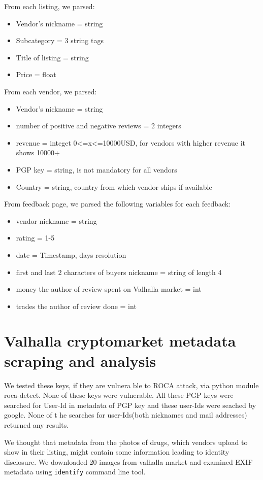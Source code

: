 \documentclass[
  digital, %
  table,   %
  lof,     %
  lot,     %
  oneside
]{fithesis3}
\begin{document}
From each listing, we parsed:

\begin{itemize}
 \item Vendor's nickname = string
 \item Subcategory = 3 string tags
 \item Title of listing = string
 \item Price = float
\end{itemize}

From each vendor, we parsed:
\begin{itemize}
\item Vendor's nickname = string
\item number of positive and negative reviews = 2 integers
\item revenue = integet 0<=x<=10000USD, for vendors with higher revenue it shows 10000+
\item PGP key = string, is not mandatory for all vendors
\item Country = string, country from which vendor ships if available
\end{itemize}

From feedback page, we parsed the following variables for each feedback:
\begin{itemize}
\item vendor nickname = string
\item rating = 1-5
\item date = Timestamp, days resolution
\item first and last 2 characters of buyers nickname = string of length 4
\item money the author of review spent on Valhalla market = int
\item trades the author of review done = int
\end{itemize}

\section{Valhalla cryptomarket metadata scraping and analysis}

We tested these keys, if they are vulnera ble to ROCA attack, via python module roca-detect. None of these keys were vulnerable.
All these PGP keys were searched for User-Id in metadata of PGP key and these user-Ids were seached by google. None of t
he searches for user-Ids(both nicknames and mail addresses) returned any results.

We thought that metadata from the photos of drugs, which vendors upload
to show in their listing, might contain some information leading to identity disclosure.
We downloaded 20 images from valhalla market and examined 
EXIF metadata using \texttt{identify} command line tool.
\end{document}

